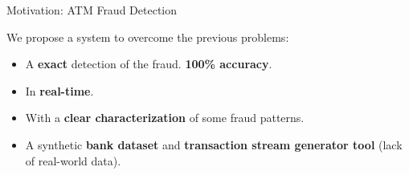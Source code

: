 \begin{frame}{Motivation: ATM Fraud Detection}

We propose a system to overcome the previous problems:
\vspace{1em}
\begin{itemize}
    \item[\textcolor{green}{\ding{51}}] A \textbf{exact} detection of the fraud. \textbf{100\% accuracy}.
    \vspace{1em}
    \item[\textcolor{green}{\ding{51}}] In \textbf{real-time}.
    \vspace{1em}
    \item[\textcolor{green}{\ding{51}}] With a \textbf{clear characterization} of some fraud patterns.
    \vspace{1em}
    \item[\textcolor{green}{\ding{51}}] A synthetic \textbf{bank dataset} and \textbf{transaction stream generator tool} (lack of real-world data). %
\end{itemize}
\end{frame}

\begin{comment}
\begin{frame}{Contributions}
\begin{itemize}
\item A \textbf{Continuous Query Engine} to detect abnormal or suspicious ATM transactions in \textbf{real-time}, with \textbf{100\% accuracy: $\mathsf{DP_{ATM}}$}
\vspace{1em}
\pause
\item A \textbf{characterization} of some possible \textbf{fraud} (graph) \textbf{patterns}.
\vspace{1em}
\pause
\item A general technique for addressing the problem of \textbf{continuous 
query evaluation} against an \textbf{evolving graph database}.
\vspace{1em}
\pause
\item A synthetic \textbf{bank dataset} and \textbf{transaction stream generator tool} (lack of real-world data). %
\end{itemize}
\end{frame}
\end{comment}

